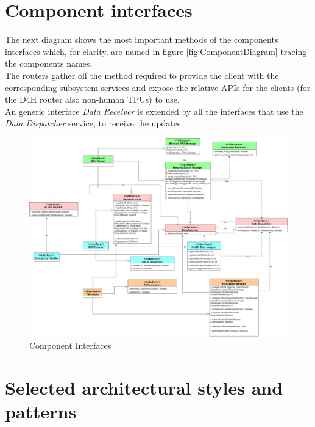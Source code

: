 \section{Component interfaces}
The next diagram shows the most important methods of the components interfaces which, for clarity, are named in figure \ref{fig:ComponentDiagram} tracing the components names.\\
The routers gather oll the method required to provide the client with the corresponding subsystem services and expose the relative APIs for the clients (for the D4H router also non-human TPUs) to use. \\
An generic interface \textit{Data Receiver} is extended by all the interfaces that use the \textit{Data Dispatcher} service, to receive the updates.
\begin{figure}[H]
\caption{Component Interfaces}
\centering
\includegraphics[width = \textwidth]{sections/architecturalDesign/componentInterfaces.png}
\end{figure}
\section{Selected architectural styles and patterns}
